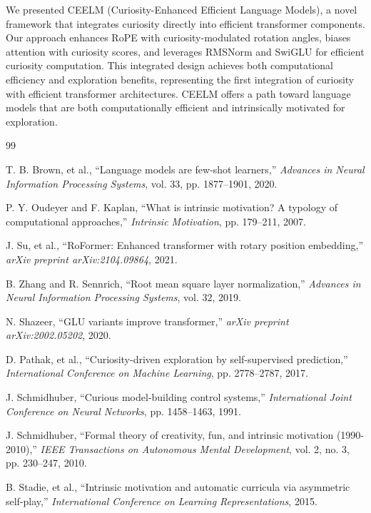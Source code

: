 \documentclass{IEEEtran}
\begin{document}
We presented CEELM (Curiosity-Enhanced Efficient Language Models), a novel framework that integrates curiosity directly into efficient transformer components. Our approach enhances RoPE with curiosity-modulated rotation angles, biases attention with curiosity scores, and leverages RMSNorm and SwiGLU for efficient curiosity computation. This integrated design achieves both computational efficiency and exploration benefits, representing the first integration of curiosity with efficient transformer architectures. CEELM offers a path toward language models that are both computationally efficient and intrinsically motivated for exploration.

\begin{thebibliography}{99}

T. B. Brown, et al., ``Language models are few-shot learners,'' \textit{Advances in Neural Information Processing Systems}, vol. 33, pp. 1877--1901, 2020.

P. Y. Oudeyer and F. Kaplan, ``What is intrinsic motivation? A typology of computational approaches,'' \textit{Intrinsic Motivation}, pp. 179--211, 2007.

J. Su, et al., ``RoFormer: Enhanced transformer with rotary position embedding,'' \textit{arXiv preprint arXiv:2104.09864}, 2021.

B. Zhang and R. Sennrich, ``Root mean square layer normalization,'' \textit{Advances in Neural Information Processing Systems}, vol. 32, 2019.

N. Shazeer, ``GLU variants improve transformer,'' \textit{arXiv preprint arXiv:2002.05202}, 2020.

D. Pathak, et al., ``Curiosity-driven exploration by self-supervised prediction,'' \textit{International Conference on Machine Learning}, pp. 2778--2787, 2017.

J. Schmidhuber, ``Curious model-building control systems,'' \textit{International Joint Conference on Neural Networks}, pp. 1458--1463, 1991.

J. Schmidhuber, ``Formal theory of creativity, fun, and intrinsic motivation (1990-2010),'' \textit{IEEE Transactions on Autonomous Mental Development}, vol. 2, no. 3, pp. 230--247, 2010.

B. Stadie, et al., ``Intrinsic motivation and automatic curricula via asymmetric self-play,'' \textit{International Conference on Learning Representations}, 2015.


\end{thebibliography}
\end{document}
